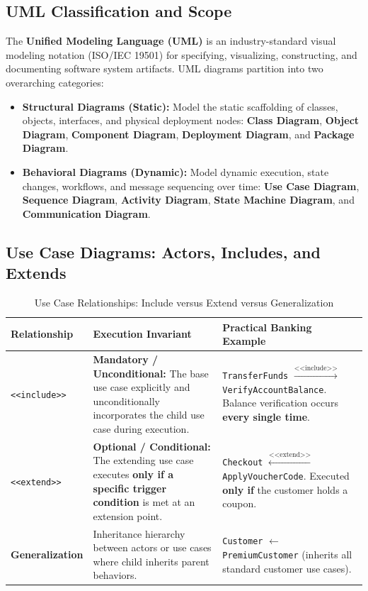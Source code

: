 \subsection{UML Classification and Scope}
The \textbf{Unified Modeling Language (UML)} is an industry-standard visual modeling notation (ISO/IEC 19501) for specifying, visualizing, constructing, and documenting software system artifacts. UML diagrams partition into two overarching categories:
\begin{itemize}
    \item \textbf{Structural Diagrams (Static):} Model the static scaffolding of classes, objects, interfaces, and physical deployment nodes: \textbf{Class Diagram}, \textbf{Object Diagram}, \textbf{Component Diagram}, \textbf{Deployment Diagram}, and \textbf{Package Diagram}.
    \item \textbf{Behavioral Diagrams (Dynamic):} Model dynamic execution, state changes, workflows, and message sequencing over time: \textbf{Use Case Diagram}, \textbf{Sequence Diagram}, \textbf{Activity Diagram}, \textbf{State Machine Diagram}, and \textbf{Communication Diagram}.
\end{itemize}

\subsection{Use Case Diagrams: Actors, Includes, and Extends}
\begin{table}[htbp]
\centering
\small
\caption{Use Case Relationships: Include versus Extend versus Generalization}
\label{tab:use_case_relationships}
\begin{tabularx}{\textwidth}{l p{4.5cm} X}
\toprule
\textbf{Relationship} & \textbf{Execution Invariant} & \textbf{Practical Banking Example} \\
\midrule
\texttt{<<include>>} & \textbf{Mandatory / Unconditional:} The base use case explicitly and unconditionally incorporates the child use case during execution. & \texttt{TransferFunds} $\xrightarrow{\text{<<include>>}}$ \texttt{VerifyAccountBalance}. Balance verification occurs \textbf{every single time}. \\
\texttt{<<extend>>} & \textbf{Optional / Conditional:} The extending use case executes \textbf{only if a specific trigger condition} is met at an extension point. & \texttt{Checkout} $\xleftarrow{\text{<<extend>>}}$ \texttt{ApplyVoucherCode}. Executed \textbf{only if} the customer holds a coupon. \\
\textbf{Generalization} & Inheritance hierarchy between actors or use cases where child inherits parent behaviors. & \texttt{Customer} $\longleftarrow$ \texttt{PremiumCustomer} (inherits all standard customer use cases). \\
\bottomrule
\end{tabularx}
\end{table}

